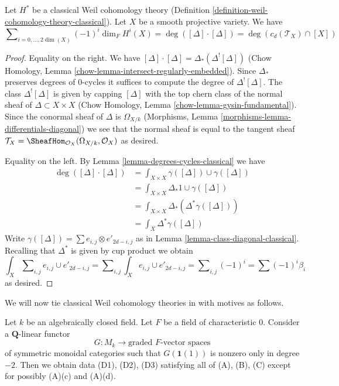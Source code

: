 \begin{lemma}
\label{lemma-square-diagonal-classical}
Let $H^*$ be a classical Weil cohomology theory
(Definition \ref{definition-weil-cohomology-theory-classical}).
Let $X$ be a smooth projective variety. We have
$$
\sum\nolimits_{i = 0, \ldots, 2\dim(X)} (-1)^i\dim_F H^i(X) =
\deg([\Delta] \cdot [\Delta]) = \deg(c_d(\mathcal{T}_X) \cap [X])
$$
\end{lemma}

\begin{proof}
Equality on the right. We have
$[\Delta] \cdot [\Delta] = \Delta_*(\Delta^![\Delta])$
(Chow Homology, Lemma \ref{chow-lemma-intersect-regularly-embedded}).
Since $\Delta_*$ preserves degrees of $0$-cycles it suffices to compute
the degree of $\Delta^![\Delta]$. The class $\Delta^![\Delta]$ is given
by capping $[\Delta]$ with
the top chern class of the normal sheaf of $\Delta \subset X \times X$
(Chow Homology, Lemma \ref{chow-lemma-gysin-fundamental}).
Since the conormal sheaf of $\Delta$ is $\Omega_{X/k}$
(Morphisms, Lemma \ref{morphisms-lemma-differentials-diagonal})
we see that the normal sheaf is equal to the tangent sheaf
$\mathcal{T}_X = \SheafHom_{\mathcal{O}_X}(\Omega_{X/k}, \mathcal{O}_X)$
as desired.

\medskip\noindent
Equality on the left. By Lemma \ref{lemma-degrees-cycles-classical} we have
\begin{align*}
\deg([\Delta] \cdot [\Delta])
& =
\int_{X \times X} \gamma([\Delta]) \cup \gamma([\Delta]) \\
& =
\int_{X \times X} \Delta_*1 \cup \gamma([\Delta]) \\
& =
\int_{X \times X} \Delta_*(\Delta^*\gamma([\Delta])) \\
& =
\int_X \Delta^*\gamma([\Delta])
\end{align*}
Write $\gamma([\Delta]) = \sum  e_{i, j} \otimes e'_{2d - i , j}$
as in Lemma \ref{lemma-class-diagonal-classical}.
Recalling that $\Delta^*$ is given by cup product we obtain
$$
\int_X \sum\nolimits_{i, j} e_{i, j} \cup e'_{2d - i, j} =
\sum\nolimits_{i, j} \int_X e_{i, j} \cup e'_{2d - i, j} =
\sum\nolimits_{i, j} (-1)^i = \sum (-1)^i\beta_i
$$
as desired.
\end{proof}




\noindent
We will now tie classical Weil cohomology theories in with motives as follows.

\begin{lemma}
\label{lemma-from-functor-to-weil-classical}
Let $k$ be an algebraically closed field. Let $F$ be a field of
characteristic $0$. Consider a $\mathbf{Q}$-linear functor
$$
G : M_k \longrightarrow \text{graded }F\text{-vector spaces}
$$
of symmetric monoidal categories such that $G(\mathbf{1}(1))$
is nonzero only in degree $-2$. Then we obtain data (D1), (D2), (D3)
satisfying all of (A), (B), (C) except for possibly (A)(c) and (A)(d).
\end{lemma}

